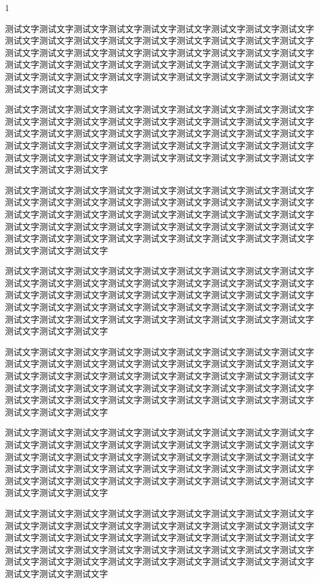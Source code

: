\begin{Project}
\begin{QuestionItem}[2]{1}
	\item 测试文字测试文字测试文字测试文字测试文字测试文字测试文字测试文字测试文字测试文字测试文字测试文字测试文字测试文字测试文字测试文字测试文字测试文字测试文字测试文字测试文字测试文字测试文字测试文字测试文字测试文字测试文字测试文字测试文字测试文字测试文字测试文字测试文字测试文字测试文字测试文字测试文字测试文字测试文字测试文字测试文字测试文字测试文字测试文字测试文字测试文字测试文字测试文字
	\item 测试文字测试文字测试文字测试文字测试文字测试文字测试文字测试文字测试文字测试文字测试文字测试文字测试文字测试文字测试文字测试文字测试文字测试文字测试文字测试文字测试文字测试文字测试文字测试文字测试文字测试文字测试文字测试文字测试文字测试文字测试文字测试文字测试文字测试文字测试文字测试文字测试文字测试文字测试文字测试文字测试文字测试文字测试文字测试文字测试文字测试文字测试文字测试文字
	\item 测试文字测试文字测试文字测试文字测试文字测试文字测试文字测试文字测试文字测试文字测试文字测试文字测试文字测试文字测试文字测试文字测试文字测试文字测试文字测试文字测试文字测试文字测试文字测试文字测试文字测试文字测试文字测试文字测试文字测试文字测试文字测试文字测试文字测试文字测试文字测试文字测试文字测试文字测试文字测试文字测试文字测试文字测试文字测试文字测试文字测试文字测试文字测试文字
	\item 测试文字测试文字测试文字测试文字测试文字测试文字测试文字测试文字测试文字测试文字测试文字测试文字测试文字测试文字测试文字测试文字测试文字测试文字测试文字测试文字测试文字测试文字测试文字测试文字测试文字测试文字测试文字测试文字测试文字测试文字测试文字测试文字测试文字测试文字测试文字测试文字测试文字测试文字测试文字测试文字测试文字测试文字测试文字测试文字测试文字测试文字测试文字测试文字
	\item 测试文字测试文字测试文字测试文字测试文字测试文字测试文字测试文字测试文字测试文字测试文字测试文字测试文字测试文字测试文字测试文字测试文字测试文字测试文字测试文字测试文字测试文字测试文字测试文字测试文字测试文字测试文字测试文字测试文字测试文字测试文字测试文字测试文字测试文字测试文字测试文字测试文字测试文字测试文字测试文字测试文字测试文字测试文字测试文字测试文字测试文字测试文字测试文字
	\item 测试文字测试文字测试文字测试文字测试文字测试文字测试文字测试文字测试文字测试文字测试文字测试文字测试文字测试文字测试文字测试文字测试文字测试文字测试文字测试文字测试文字测试文字测试文字测试文字测试文字测试文字测试文字测试文字测试文字测试文字测试文字测试文字测试文字测试文字测试文字测试文字测试文字测试文字测试文字测试文字测试文字测试文字测试文字测试文字测试文字测试文字测试文字测试文字
	\item 测试文字测试文字测试文字测试文字测试文字测试文字测试文字测试文字测试文字测试文字测试文字测试文字测试文字测试文字测试文字测试文字测试文字测试文字测试文字测试文字测试文字测试文字测试文字测试文字测试文字测试文字测试文字测试文字测试文字测试文字测试文字测试文字测试文字测试文字测试文字测试文字测试文字测试文字测试文字测试文字测试文字测试文字测试文字测试文字测试文字测试文字测试文字测试文字

\end{QuestionItem}
\end{Project}
